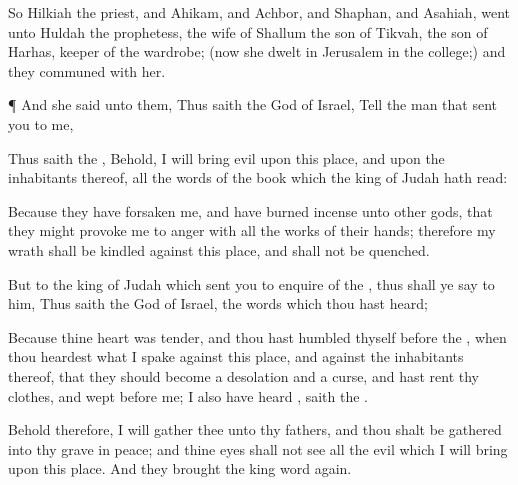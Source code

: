 {So
Hilkiah the
priest, and
Ahikam, and
Achbor, and
Shaphan, and
Asahiah,
went unto
Huldah the
prophetess, the
wife of
Shallum the
son of
Tikvah, the
son of
Harhas,
keeper of the
wardrobe; (now she
dwelt in
Jerusalem in the
college;) and they
communed with her.


\par }{\PP {}¶ And she
said unto them, Thus
saith the
{}
God of
Israel,
Tell the
man that
sent you to me,

Thus
saith the
{}, Behold, I will
bring
evil upon this
place, and upon the
inhabitants thereof,
{} all the
words of the
book which the
king of
Judah hath
read:

Because they have
forsaken me, and have burned
incense unto
other
gods, that they might provoke me to
anger with all the
works of their
hands; therefore my
wrath shall be
kindled against this
place, and shall not be
quenched.

But to the
king of
Judah which
sent you to
enquire of the
{}, thus shall ye
say to him, Thus
saith the
{}
God of
Israel,
{} the
words which thou hast
heard;

Because thine
heart was
tender, and thou hast
humbled thyself
before the
{}, when thou
heardest what I
spake against this
place, and against the
inhabitants thereof, that they should become a
desolation and a
curse, and hast
rent thy
clothes, and
wept
before me; I also have
heard
{},
saith the
{}.

Behold therefore, I will
gather thee unto thy
fathers, and thou shalt be
gathered into thy
grave in
peace; and thine
eyes shall not
see all the
evil which I will
bring upon this
place. And they
brought the
king
word
again.




\par }
